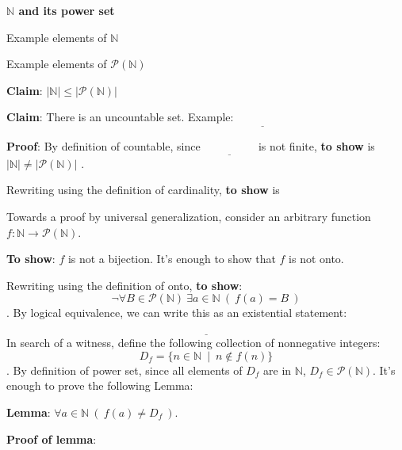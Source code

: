 \documentclass[12pt, oneside]{article}
\begin{document}
{\bf $\mathbb{N}$ and its power set}

Example elements of $\mathbb{N}$ 

\vspace{20pt}

Example elements of $\mathcal{P}(\mathbb{N})$

\vspace{20pt}

{\bf Claim}: $| \mathbb{N} | \leq |\mathcal{P} ( \mathbb{N} ) |$

\vspace{100pt}
\newpage
{\bf Claim}: There is an uncountable set.  Example: $\underline{\phantom{~~~\mathcal{P}(\mathbb{N})~~~}}$

{\bf Proof}:  By definition of countable, since $\underline{\phantom{~~~\mathcal{P}(\mathbb{N})~~~}}$
is not finite, {\bf to show} is $|\mathbb{N}| \neq  |\mathcal{P}(\mathbb{N})|$ .

Rewriting using  the definition of  cardinality, {\bf to show} is




Towards a proof by  universal generalization,  consider  an arbitrary function $f:  \mathbb{N} \to\mathcal{P}(\mathbb{N})$.

{\bf To show}: $f$ is not a bijection.  It's enough to show that $f$ is not onto.

Rewriting using the definition of  onto, {\bf to show}:
\[
\neg  \forall  B \in  \mathcal{P}(\mathbb{N}) ~\exists a \in \mathbb{N}  ~(~f(a) =  B~)
\]
. By logical  equivalence, we can write this as an existential statement:
\[
\underline{\phantom{\qquad\qquad\exists B \in  \mathcal{P}(\mathbb{N}) ~\forall a \in \mathbb{N}  ~(~f(a) \neq  B~)\qquad\qquad}}
\]
In search of a witness, define the following  collection of nonnegative integers:
\[
D_f = \{ n \in \mathbb{N}  ~\mid~  n \notin f(n)  \}
\]
. By  definition  of power  set, since  all elements  of  $D_f$ are  in  $\mathbb{N}$,   $D_f \in \mathcal{P}(\mathbb{N})$.  It's enough to prove the following Lemma: 

{\bf Lemma}: $\forall a \in \mathbb{N}  ~(~f(a) \neq  D_f~)$.


{\bf Proof  of lemma}: \\
\end{document}
